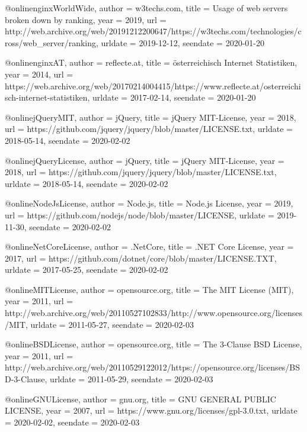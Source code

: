 {{{@online{nginxWorldWide,
  author   = {w3techs.com},
  title    = {Usage of web servers broken down by ranking},
  year     = 2019,
  url      = {http://web.archive.org/web/20191212200647/https://w3techs.com/technologies/cross/web_server/ranking},
  urldate  = {2019-12-12},
  seendate = {2020-01-20}
}

@online{nginxAT,
  author   = {reflecte.at},
  title    = {österreichisch Internet Statistiken},
  year     = 2014,
  url      = {https://web.archive.org/web/20170214004415/https://www.reflecte.at/osterreichisch-internet-statistiken},
  urldate  = {2017-02-14},
  seendate = {2020-01-20}
}

@online{jQueryMIT,
  author   = {jQuery},
  title    = {jQuery MIT-License},
  year     = 2018,
  url      = {https://github.com/jquery/jquery/blob/master/LICENSE.txt},
  urldate  = {2018-05-14},
  seendate = {2020-02-02}
}


@online{jQueryLicense,
  author   = {jQuery},
  title    = {jQuery MIT-License},
  year     = 2018,
  url      = {https://github.com/jquery/jquery/blob/master/LICENSE.txt},
  urldate  = {2018-05-14},
  seendate = {2020-02-02}
}

@online{NodeJsLicense,
  author   = {Node.js},
  title    = {Node.js License},
  year     = 2019,
  url      = {https://github.com/nodejs/node/blob/master/LICENSE},
  urldate  = {2019-11-30},
  seendate = {2020-02-02}
}

@online{NetCoreLicense,
  author   = {.NetCore},
  title    = {.NET Core License},
  year     = 2017,
  url      = {https://github.com/dotnet/core/blob/master/LICENSE.TXT},
  urldate  = {2017-05-25},
  seendate = {2020-02-02}
}

@online{MITLicense,
  author   = {opensource.org},
  title    = {The MIT License (MIT)},
  year     = 2011,
  url      = {http://web.archive.org/web/20110527102833/http://www.opensource.org/licenses/MIT},
  urldate  = {2011-05-27},
  seendate = {2020-02-03}
}

@online{BSDLicense,
  author   = {opensource.org},
  title    = {The 3-Clause BSD License},
  year     = 2011,
  url      = {http://web.archive.org/web/20110529122012/https://opensource.org/licenses/BSD-3-Clause},
  urldate  = {2011-05-29},
  seendate = {2020-02-03}
}

@online{GNULicense,
  author   = {gnu.org},
  title    = {GNU GENERAL PUBLIC LICENSE},
  year     = 2007,
  url      = {https://www.gnu.org/licenses/gpl-3.0.txt},
  urldate  = {2020-02-02},
  seendate = {2020-02-03}
}


}}}
